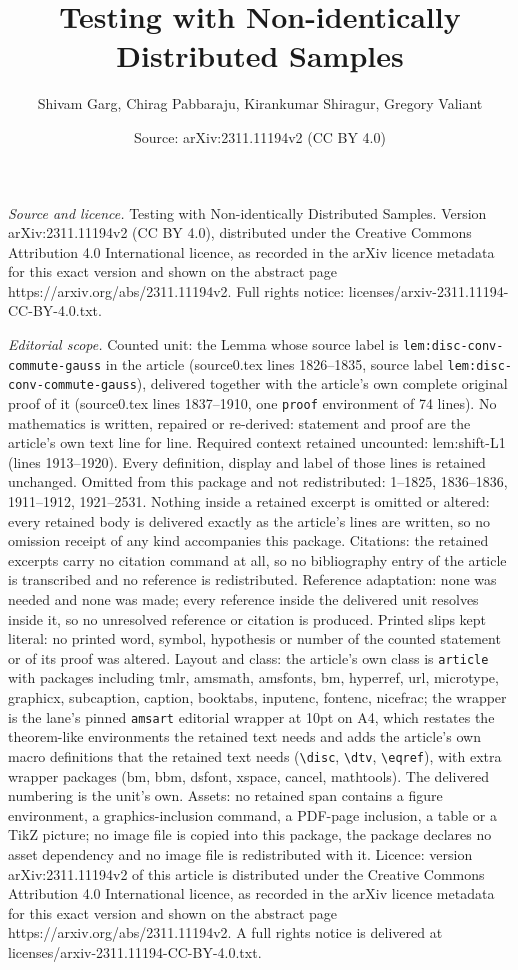 \documentclass[10pt,a4paper]{amsart}
\title[Testing with Non-identically Distributed Samples]{Testing with Non-identically Distributed Samples}
\author{Shivam Garg, Chirag Pabbaraju, Kirankumar Shiragur, Gregory Valiant}
\date{Source: arXiv:2311.11194v2 (CC BY 4.0)}
\begin{document}
\maketitle

\noindent\emph{Source and licence.} Testing with Non-identically Distributed Samples. Version arXiv:2311.11194v2 (CC BY 4.0), distributed under the Creative Commons Attribution 4.0 International licence, as recorded in the arXiv licence metadata for this exact version and shown on the abstract page https://arxiv.org/abs/2311.11194v2. Full rights notice: licenses/arxiv-2311.11194-CC-BY-4.0.txt.\par\smallskip

\noindent\textit{Editorial scope.} Counted unit: the Lemma whose source label is \texttt{lem:disc-conv-commute-gauss} in the article (source0.tex lines 1826--1835, source label \texttt{lem:disc-conv-commute-gauss}), delivered together with the article's own complete original proof of it (source0.tex lines 1837--1910, one \texttt{proof} environment of 74 lines). No mathematics is written, repaired or re-derived: statement and proof are the article's own text line for line. Required context retained uncounted: lem:shift-L1 (lines 1913--1920). Every definition, display and label of those lines is retained unchanged. Omitted from this package and not redistributed: 1--1825, 1836--1836, 1911--1912, 1921--2531. Nothing inside a retained excerpt is omitted or altered: every retained body is delivered exactly as the article's lines are written, so no omission receipt of any kind accompanies this package. Citations: the retained excerpts carry no citation command at all, so no bibliography entry of the article is transcribed and no reference is redistributed. Reference adaptation: none was needed and none was made; every reference inside the delivered unit resolves inside it, so no unresolved reference or citation is produced. Printed slips kept literal: no printed word, symbol, hypothesis or number of the counted statement or of its proof was altered. Layout and class: the article's own class is \texttt{article} with packages including tmlr, amsmath, amsfonts, bm, hyperref, url, microtype, graphicx, subcaption, caption, booktabs, inputenc, fontenc, nicefrac; the wrapper is the lane's pinned \texttt{amsart} editorial wrapper at 10pt on A4, which restates the theorem-like environments the retained text needs and adds the article's own macro definitions that the retained text needs (\texttt{\textbackslash disc}, \texttt{\textbackslash dtv}, \texttt{\textbackslash eqref}), with extra wrapper packages (bm, bbm, dsfont, xspace, cancel, mathtools). The delivered numbering is the unit's own. Assets: no retained span contains a figure environment, a graphics-inclusion command, a PDF-page inclusion, a table or a TikZ picture; no image file is copied into this package, the package declares no asset dependency and no image file is redistributed with it. Licence: version arXiv:2311.11194v2 of this article is distributed under the Creative Commons Attribution 4.0 International licence, as recorded in the arXiv licence metadata for this exact version and shown on the abstract page https://arxiv.org/abs/2311.11194v2. A full rights notice is delivered at licenses/arxiv-2311.11194-CC-BY-4.0.txt. 
\end{document}
